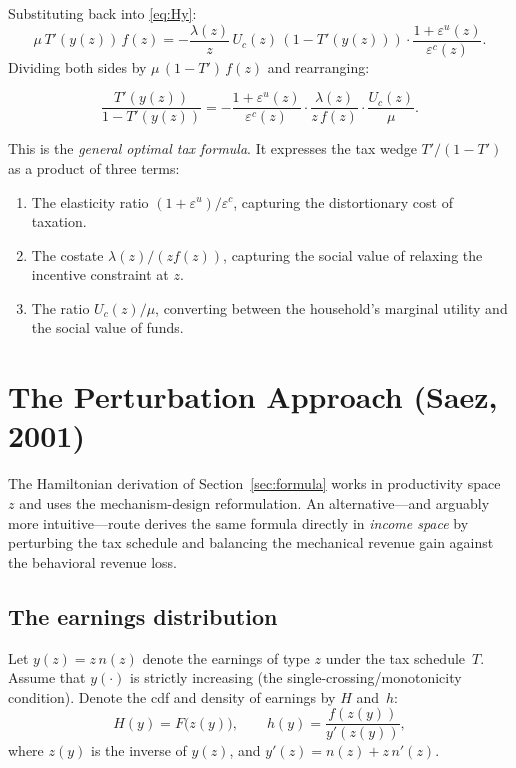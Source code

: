 \documentclass[12pt,a4paper]{article}
\theoremstyle{definition}
\theoremstyle{plain}
\theoremstyle{remark}
\begin{document}
Substituting back into \eqref{eq:Hy}:
\[
  \mu \, T'(y(z)) \, f(z) = -\frac{\lambda(z)}{z} \, U_c(z) \, (1 - T'(y(z))) \cdot \frac{1+\varepsilon^u(z)}{\varepsilon^c(z)}.
\]
Dividing both sides by $\mu \,(1-T')\,f(z)$ and rearranging:

\begin{equation}
\label{eq:general_tax}
  \boxed{
  \frac{T'(y(z))}{1 - T'(y(z))}
  = -\frac{1 + \varepsilon^u(z)}{\varepsilon^c(z)} \cdot \frac{\lambda(z)}{z \, f(z)} \cdot \frac{U_c(z)}{\mu}.
  }
\end{equation}

This is the \emph{general optimal tax formula}. It expresses the tax wedge $T'/(1-T')$ as a product of three terms:
\begin{enumerate}[label=(\roman*)]
  \item The elasticity ratio $(1+\varepsilon^u)/\varepsilon^c$, capturing the distortionary cost of taxation.
  \item The costate $\lambda(z)/(z f(z))$, capturing the social value of relaxing the incentive constraint at $z$.
  \item The ratio $U_c(z)/\mu$, converting between the household's marginal utility and the social value of funds.
\end{enumerate}
\section{The Perturbation Approach (Saez, 2001)}
\label{sec:perturbation}

The Hamiltonian derivation of Section~\ref{sec:formula} works in
productivity space~$z$ and uses the mechanism-design reformulation.
An alternative---and arguably more intuitive---route derives the
same formula directly in \emph{income space} by perturbing the
tax schedule and balancing the mechanical revenue gain against the
behavioral revenue loss. 

\subsection{The earnings distribution}

Let $y(z)=z\,n(z)$ denote the earnings of type $z$ under the
tax schedule~$T$. Assume that $y(\cdot)$ is strictly increasing
(the single-crossing/monotonicity condition). Denote the cdf and
density of earnings by $H$ and~$h$:
\begin{equation}
\label{eq:H-def}
  H(y) = F\!\bigl(z(y)\bigr), \qquad
  h(y) = \frac{f(z(y))}{y'(z(y))},
\end{equation}
where $z(y)$ is the inverse of $y(z)$, and $y'(z)=n(z)+z\,n'(z)$.
\end{document}

